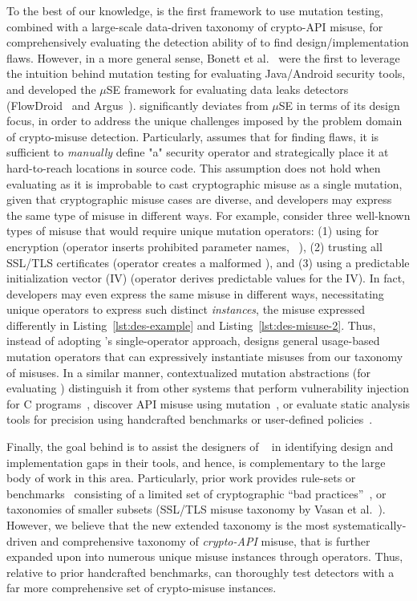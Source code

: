 To the best of our knowledge, \tool is the first framework to use mutation testing, combined with a large-scale data-driven taxonomy of crypto-API misuse, for comprehensively evaluating the detection ability of \detectors to find design/implementation flaws.
However, in a more general sense, Bonett et al.~\cite{bkm+18} were the first to leverage the intuition behind mutation testing for evaluating Java/Android security tools, and developed the $\mu$SE framework for evaluating data leaks detectors (\eg FlowDroid~\cite{arf+14} and Argus~\cite{wror14}).
\tool significantly deviates from $\mu$SE in terms of its design focus, in order to address the unique challenges imposed by the problem domain of crypto-misuse detection. Particularly, \muse assumes that for finding flaws, it is sufficient to {\em manually} define "a" security operator and strategically place it at hard-to-reach locations in source code.
This assumption does not hold when evaluating \detectors as it is improbable to cast cryptographic misuse as a single mutation, given that cryptographic misuse cases are diverse, and developers may express the same type of misuse in different ways.
For example, consider three well-known types of misuse that would require unique mutation operators: {\sf (1)} using \DES for encryption (operator inserts prohibited parameter names, \eg\ \DES), {\sf (2)} trusting all SSL/TLS certificates (operator creates a malformed \trustManager), and {\sf (3)} using a predictable initialization vector (IV) (operator derives predictable values for the IV).
In fact, developers may even express the same misuse in different ways, necessitating unique operators to express such distinct {\em instances}, \eg the \DES misuse expressed differently in Listing~\ref{lst:des-example} and Listing~\ref{lst:des-misuse-2}.
Thus, instead of adopting \muse's single-operator approach, \tool designs general usage-based mutation operators that can expressively instantiate misuses from our taxonomy of misuses.
In a similar manner, \tools contextualized mutation abstractions (\ie for evaluating \detectors) distinguish it from other systems that perform vulnerability injection for C programs~\cite{dhk+16}, discover API misuse using mutation~\cite{WLW+19,GKL+19}, or evaluate static analysis tools for precision using handcrafted benchmarks or user-defined policies~\cite{QWR18,PBW18}.


Finally, the goal behind \tool is to assist the designers of \detectors~\cite{fhm+12,ebfk13,cognicrypteclipse,knr+17,KSA+18,deepsource,snyk,sonarqube,codeguru,codiga} in identifying design and implementation gaps in their tools, and hence, \tool is complementary to the large body of work in this area.
Particularly, prior work provides rule-sets or benchmarks~\cite{BDA+17,BDA+19} consisting of a limited set of cryptographic ``bad practices''~\cite{BD16}, or taxonomies of smaller subsets (\eg SSL/TLS misuse taxonomy by Vasan et al.~\cite{NVK16}).
However, we believe that the new extended taxonomy is the most systematically-driven and comprehensive taxonomy of {\em crypto-API} misuse, that is further expanded upon into numerous unique misuse instances through \tools operators.
Thus, relative to prior handcrafted benchmarks, \tool can thoroughly test detectors with a far more comprehensive set of crypto-misuse instances.

